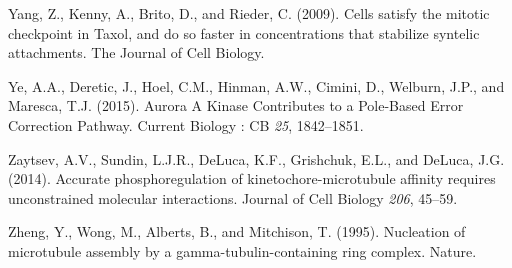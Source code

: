 \documentclass[12pt,a4paper,twoside,openright]{book}
\begin{document}
\hypertarget{ref-Yang2009}{}
Yang, Z., Kenny, A., Brito, D., and Rieder, C. (2009). Cells satisfy the
mitotic checkpoint in Taxol, and do so faster in concentrations that
stabilize syntelic attachments. The Journal of Cell Biology.

\hypertarget{ref-Ye2015}{}
Ye, A.A., Deretic, J., Hoel, C.M., Hinman, A.W., Cimini, D., Welburn,
J.P., and Maresca, T.J. (2015). Aurora A Kinase Contributes to a
Pole-Based Error Correction Pathway. Current Biology : CB \emph{25},
1842--1851.

\hypertarget{ref-Zaytsev2014}{}
Zaytsev, A.V., Sundin, L.J.R., DeLuca, K.F., Grishchuk, E.L., and
DeLuca, J.G. (2014). Accurate phosphoregulation of
kinetochore-microtubule affinity requires unconstrained molecular
interactions. Journal of Cell Biology \emph{206}, 45--59.

\hypertarget{ref-Zheng1995}{}
Zheng, Y., Wong, M., Alberts, B., and Mitchison, T. (1995). Nucleation
of microtubule assembly by a gamma-tubulin-containing ring complex.
Nature.
\end{document}
